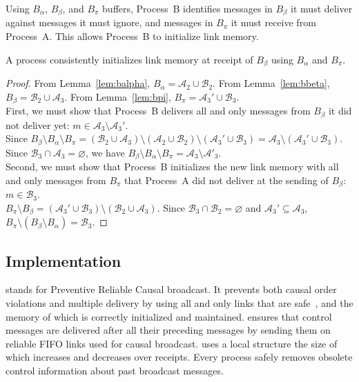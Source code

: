 \noindent Using $B_\alpha$, $B_\beta$, and $B_\pi$ buffers, Process~B identifies
messages in $B_\beta$ it must deliver against messages it must ignore, and
messages in $B_\pi$ it must receive from Process~A. This allows Process~B to
initialize link memory.

\begin{theorem}
  A process consistently initializes link memory at receipt of $B_\beta$ using
  $B_\alpha$ and $B_\pi$.
\end{theorem}

\begin{proof}
  From Lemma~\ref{lem:balpha}, $B_\alpha = \mathcal{A}_2 \cup \mathcal{B}_2$.
  From Lemma~\ref{lem:bbeta}, $B_\beta= \mathcal{B}_2 \cup \mathcal{A}_3$. From
  Lemma~\ref{lem:bpi}, $B_\pi = \mathcal{A}_3' \cup \mathcal{B}_3$. \\
  First, we must show that Process~B delivers all and only messages from
  $B_\beta$ it did not deliver yet:
  $m \in \mathcal{A}_3 \setminus \mathcal{A}_3'$.\\
  Since
  $B_\beta \setminus B_\alpha \setminus B_\pi = (\mathcal{B}_2 \cup
  \mathcal{A}_3) \setminus (\mathcal{A}_2 \cup \mathcal{B}_2) \setminus
  (\mathcal{A}_3' \cup \mathcal{B}_3) = \mathcal{A}_3 \setminus (\mathcal{A}_3'
  \cup \mathcal{B}_3)$.
  Since $\mathcal{B}_3 \cap \mathcal{A}_3 = \varnothing$, we have
  $B_\beta \setminus B_\alpha \setminus B_\pi = \mathcal{A}_3\setminus
  \mathcal{A}'_3$.\\
  Second, we must show that Process~B initializes the new link memory with all
  and only messages from $B_\pi$ that Process~A did not deliver at the sending
  of $B_\beta$: $m\in \mathcal{B}_3$.\\
  $B_\pi \setminus B_\beta = (\mathcal{A}_3' \cup \mathcal{B}_3) \setminus
  (\mathcal{B}_2 \cup \mathcal{A}_3)$.
  Since $\mathcal{B}_3 \cap \mathcal{B}_2 = \varnothing$ and
  $\mathcal{A}_3' \subseteq \mathcal{A}_3$,
  $B_\pi \setminus (B_\beta \setminus B_\alpha) = \mathcal{B}_3$.
\end{proof}

\subsection{Implementation}

\RPCBROADCAST stands for Preventive Reliable Causal broadcast. It prevents both
causal order violations and multiple delivery by using all and only links that
are safe~\cite{nedelec2018pcbroadcast}, and the memory of which is correctly
initialized and maintained. \RPCBROADCAST ensures that control messages are
delivered after all their preceding messages by sending them on reliable FIFO
links used for causal broadcast. \RPCBROADCAST uses a local structure the size
of which increases and decreases over receipts. Every process safely removes
obsolete control information about past broadcast messages.


